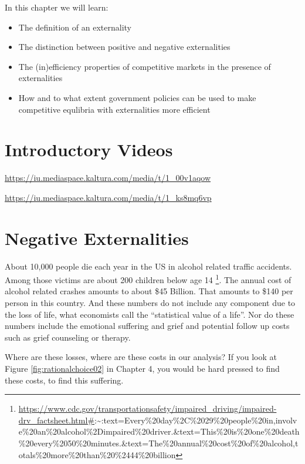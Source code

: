 \documentclass[
]{book}
\providecommand{\tightlist}{%
  \setlength{\itemsep}{0pt}\setlength{\parskip}{0pt}}
\begin{document}
In this chapter we will learn:

\begin{itemize}
\tightlist
\item
  The definition of an externality
\item
  The distinction between positive and negative externalities
\item
  The (in)efficiency properties of competitive markets in the presence of externalities
\item
  How and to what extent government policies can be used to make competitive equlibria with externalities more efficient
\end{itemize}

\hypertarget{introductory-videos}{%
\section{Introductory Videos}\label{introductory-videos}}

\url{https://iu.mediaspace.kaltura.com/media/t/1_00v1aqow}

\url{https://iu.mediaspace.kaltura.com/media/t/1_ks8mq6vp}

\hypertarget{negative-externalities}{%
\section{Negative Externalities}\label{negative-externalities}}

About 10,000 people die each year in the US in alcohol related traffic accidents. Among those victims are about 200 children below age 14 \footnote{\url{https://www.cdc.gov/transportationsafety/impaired_driving/impaired-drv_factsheet.html\#}:\textasciitilde:text=Every\%20day\%2C\%2029\%20people\%20in,involve\%20an\%20alcohol\%2Dimpaired\%20driver.\&text=This\%20is\%20one\%20death\%20every\%2050\%20minutes.\&text=The\%20annual\%20cost\%20of\%20alcohol,totals\%20more\%20than\%20\%2444\%20billion}. The annual cost of alcohol related crashes amounts to about \$45 Billion. That amounts to \$140 per person in this country. And these numbers do not include any component due to the loss of life, what economists call the ``statistical value of a life''. Nor do these numbers include the emotional suffering and grief and potential follow up costs such as grief counseling or therapy.

Where are these losses, where are these costs in our analysis? If you look at Figure \ref{fig:rationalchoice02} in Chapter 4, you would be hard pressed to find these costs, to find this suffering.
\end{document}
